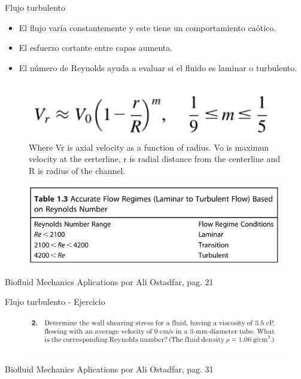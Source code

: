 \begin{frame}{Flujo turbulento}
\justifying
\begin{itemize}
\item El flujo varía constantemente y este tiene un comportamiento caótico.
\item El esfuerzo cortante entre capas aumenta.
\item El número de Reynolds ayuda a evaluar si el fluido es laminar o turbulento.
\end{itemize}

\begin{figure}[H]
\centering
\includegraphics[scale=0.25]{Section_Files/S2-imagenes-Manuel/06.png}
\caption{Where Vr is axial velocity as a function of radius. Vo is maximun velocity at the certerline, r is radial distance from the centerline and R is radius of the channel.}
\end{figure}
\begin{figure}[H]
\centering
\includegraphics[scale=0.3]{Section_Files/S2-imagenes-Manuel/08.png}
\end{figure}
{\tiny Biofluid Mechanics Aplications por Ali Ostadfar, pag. 21}
\end{frame}

\begin{frame}{Flujo turbulento - Ejercicio}
\justifying
\begin{figure}[H]
\centering
\includegraphics[scale=0.4]{Section_Files/S2-imagenes-Manuel/09.png}
\end{figure}
{\tiny Biofluid Mechanics Aplications por Ali Ostadfar, pag. 31}
\end{frame}

